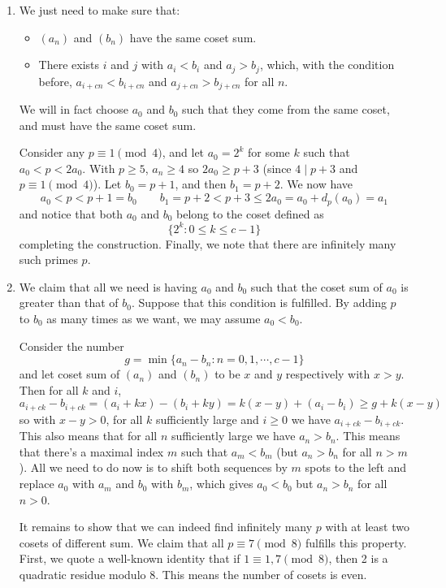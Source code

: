 \documentclass[11pt,a4paper]{article}
\begin{document}
\begin{enumerate}
	\begin{enumerate}
		\item We just need to make sure that: 
		\begin{itemize}
			\item $(a_n)$ and $(b_n)$ have the same coset sum. 
			
			\item There exists $i$ and $j$ with $a_i<b_i$ and $a_j>b_j$, which, with the condition before, $a_{i+cn}<b_{i+cn}$ and $a_{j+cn}>b_{j+cn}$ for all $n$. 
		\end{itemize}
		We will in fact choose $a_0$ and $b_0$ such that they come from the same coset, and must have the same coset sum. 
		
		Consider any $p\equiv 1\pmod{4}$, and let $a_0=2^k$ for some $k$ such that $a_0<p<2a_0$. 
		With $p\ge 5$, $a_n\ge 4$ so $2a_0\ge p+3$ (since $4\mid p+3$ and $p\equiv 1\pmod{4}$). 
		Let $b_0=p+1$, and then $b_1=p+2$. We now have 
		\[
		a_0<p<p+1=b_0\qquad b_1=p+2<p+3\le 2a_0=a_0+d_p(a_0)=a_1
		\]
		and notice that both $a_0$ and $b_0$ belong to the coset defined as 
		\[
		\{2^k: 0\le k\le c-1\}
		\]
		completing the construction. Finally, we note that there are infinitely many such primes $p$. 
		
		\item We claim that all we need is having $a_0$ and $b_0$ such that the coset sum of $a_0$ is greater than that of $b_0$. Suppose that this condition is fulfilled. By adding $p$ to $b_0$ as many times as we want, we may assume $a_0<b_0$. 
		
		Consider the number 
		\[
		g = \min\{a_n-b_n: n=0, 1, \cdots, c-1\}
		\]
		and let coset sum of $(a_n)$ and $(b_n)$ to be $x$ and $y$ respectively with $x>y$. Then for all $k$ and $i$, 
		\[
		a_{i+ck}-b_{i+ck} = (a_i+kx)-(b_i+ky)=k(x-y)+(a_i-b_i)\ge g+k(x-y)
		\]
		so with $x-y>0$, for all $k$ sufficiently large and $i\ge 0$ we have $a_{i+ck}-b_{i+ck}$. 
		This also means that for all $n$ sufficiently large we have $a_n>b_n$. This means that there's a maximal index $m$ such that $a_m<b_m$ (but $a_n>b_n$ for all $n>m$). 
		All we need to do now is to shift both sequences by $m$ spots to the left and replace $a_0$ with $a_m$ and $b_0$ with $b_m$, which gives $a_0<b_0$ but $a_n>b_n$ for all $n>0$. 
		
		It remains to show that we can indeed find infinitely many $p$ with at least two cosets of different sum. We claim that all $p\equiv 7\pmod{8}$ fulfills this property. 
		First, we quote a well-known identity that if $1\equiv 1, 7\pmod{8}$, then 2 is a quadratic residue modulo 8. This means the number of cosets is even. 
		

\end{enumerate}
\end{enumerate}
\end{document}
